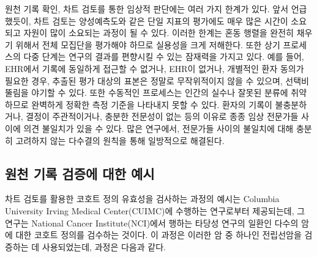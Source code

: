 \documentclass[10.5pt]{book}
\theoremstyle{definition}
\theoremstyle{definition}
\theoremstyle{definition}
\theoremstyle{remark}
\begin{document}
원천 기록 확인, 차트 검토를 통한 임상적 판단에는 여러 가지 한계가 있다.
앞서 언급했듯이, 차트 검토는 양성예측도와 같은 단일 지표의 평가에도 매우
많은 시간이 소요되고 자원이 많이 소요되는 과정이 될 수 있다. 이러한
한계는 혼동 행렬을 완전히 채우기 위해서 전체 모집단을 평가해야 하므로
실용성을 크게 저해한다. 또한 상기 프로세스의 다중 단계는 연구의 결과를
편향시킬 수 있는 잠재력을 가지고 있다. 예를 들어, EHR에서 기록에
동일하게 접근할 수 없거나, EHR이 없거나, 개별적인 환자 동의가 필요한
경우, 추출된 평가 대상의 표본은 정말로 무작위적이지 않을 수 있으며,
선택비뚤림을 야기할 수 있다. 또한 수동적인 프로세스는 인간의 실수나
잘못된 분류에 취약하므로 완벽하게 정확한 측정 기준을 나타내지 못할 수
있다. 환자의 기록이 불충분하거나, 결정이 주관적이거나, 충분한 전문성이
없는 등의 이유로 종종 임상 전문가들 사이에 의견 불일치가 있을 수 있다.
많은 연구에서, 전문가들 사이의 불일치에 대해 충분히 고려하지 않는
다수결의 원칙을 통해 일방적으로 해결된다.

\subsection{원천 기록 검증에 대한 예시}\label{----}

차트 검토를 활용한 코호트 정의 유효성을 검사하는 과정의 예시는 Columbia
University Irving Medical Center(CUIMC)에 수행하는 연구로부터
제공되는데, 그 연구는 National Cancer Institute(NCI)에서 행하는 타당성
연구의 일환인 다수의 암에 대한 코호트 정의를 검수하는 것이다. 이 과정은
이러한 암 중 하나인 전립선암을 검증하는 데 사용되었는데, 과정은 다음과
같다.
\end{document}

